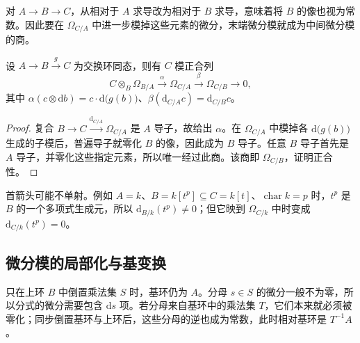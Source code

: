 对 \(A\to B\to C\)，从相对于 \(A\) 求导改为相对于 \(B\) 求导，意味着将 \(B\) 的像也视为常数。因此要在 \(\Omega_{C/A}\) 中进一步模掉这些元素的微分，末端微分模就成为中间微分模的商。

\begin{theorem}\label{b3:thm:differential-transitivity}
	设 \(A\rightarrow B\xrightarrow{g}C\) 为交换环同态，则有 \(C\) 模正合列
	\[
		C\otimes_B\Omega_{B/A}\xrightarrow{\alpha}\Omega_{C/A} \xrightarrow{\beta}\Omega_{C/B}\longrightarrow0,
	\]
	其中 \(\alpha(c\otimes \mathrm{d}b)=c\cdot\mathrm{d}\bigl(g(b)\bigr)\)、\(\beta(\mathrm{d}_{C/A}c)=\mathrm{d}_{C/B}c\)。
\end{theorem}
\begin{proof}
	复合 \(B\rightarrow C\xrightarrow{\mathrm{d}_{C/A}}\Omega_{C/A}\) 是 \(A\) 导子，故给出 \(\alpha\)。在 \(\Omega_{C/A}\) 中模掉各 \(\mathrm{d}\bigl(g(b)\bigr)\) 生成的子模后，普遍导子就零化 \(B\) 的像，因此成为 \(B\) 导子。任意 \(B\) 导子首先是 \(A\) 导子，并零化这些指定元素，所以唯一经过此商。该商即 \(\Omega_{C/B}\)，证明正合性。
\end{proof}

首箭头可能不单射。例如 \(A=k\)、\(B=k[t^p]\subseteq C=k[t]\)、\(\operatorname{char}k=p\) 时，\(t^p\) 是 \(B\) 的一个多项式生成元，所以 \(\mathrm{d}_{B/k}(t^p)\ne0\)；但它映到 \(\Omega_{C/k}\) 中时变成 \(\mathrm{d}_{C/k}(t^p)=0\)。

\subsection{微分模的局部化与基变换}
\label{b3:subsec:1402:03}

只在上环 \(B\) 中倒置乘法集 \(S\) 时，基环仍为 \(A\)。分母 \(s\in S\) 的微分一般不为零，所以分式的微分需要包含 \(\mathrm{d}s\) 项。若分母来自基环中的乘法集 \(T\)，它们本来就必须被零化；同步倒置基环与上环后，这些分母的逆也成为常数，此时相对基环是 \(T^{-1}A\)。

